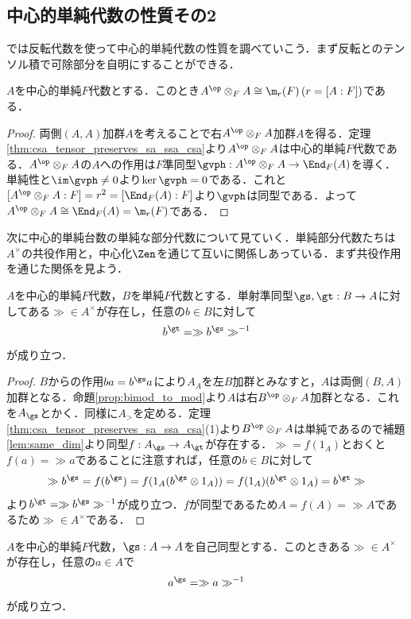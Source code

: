 \documentclass[a4paper,11pt]{jsarticle}
\begin{document}
\subsection{中心的単純代数の性質その2}
では反転代数を使って中心的単純代数の性質を調べていこう．まず反転とのテンソル積で可除部分を自明にすることができる．
\begin{thm}[CSAと反転代数のテンソル積は可除部分が自明]
  $A$を中心的単純$F$代数とする．このとき$A^{\op}\otimes_F A\cong \m_r(F)\,(r=[A:F])$である．
\end{thm}
\begin{proof}
  両側$(A,A)$加群$A$を考えることで右$A^{\op}\otimes_F A$加群$A$を得る．定理\ref{thm:csa_tensor_preserves_sa_ssa_csa}より$A^{\op}\otimes_F A$は中心的単純$F$代数である．$A^{\op}\otimes_F A$の$A$への作用は$F$準同型$\gvph:A^{\op}\otimes_F A\to \End_F(A)$を導く．単純性と$\im\gvph\neq 0$より$\ker\gvph=0$である．これと$[A^{\op}\otimes_F A:F]=r^2=[\End_F(A):F]$より$\gvph$は同型である．よって$A^{\op}\otimes_F A\cong\End_F(A)=\m_r(F)$である．
\end{proof}
次に中心的単純台数の単純な部分代数について見ていく．単純部分代数たちは$A^\times$の共役作用と，中心化$\Zen$を通じて互いに関係しあっている．まず共役作用を通じた関係を見よう．
\begin{thm}[CSAの部分SAは共役]\label{thm:sub_sa_are_conj}
  $A$を中心的単純$F$代数，$B$を単純$F$代数とする．単射準同型$\gs,\gt:B\to A$に対してある$\gg\in A^\times$が存在し，任意の$b\in B$に対して
  \[
    b^\gt = \gg b^\gs \gg^{-1}
  \]
  が成り立つ．
\end{thm}
\begin{proof}
  $B$からの作用$ba=b^{\gs} a$により$A_A$を左$B$加群とみなすと，$A$は両側$(B,A)$加群となる．命題\ref{prop:bimod_to_mod}より$A$は右$B^{\op}\otimes_F A$加群となる．これを$A_{\gs}$とかく．同様に$A_{\gt}$を定める．定理\ref{thm:csa_tensor_preserves_sa_ssa_csa}(1)より$B^{\op}\otimes_F A$は単純であるので補題\ref{lem:same_dim}より同型$f:A_{\gs}\to A_{\gt}$が存在する．$\gg=f(1_A)$とおくと$f(a)=\gg a$であることに注意すれば，任意の$b\in B$に対して
  \[
    \gg b^\gs = f(b^\gs) = f(1_A(b^\gs\otimes 1_A))=f(1_A)(b^\gt\otimes 1_A)=b^\gt\gg
  \]
  より$b^\gt=\gg b^\gs \gg^{-1}$が成り立つ．$f$が同型であるため$A=f(A)=\gg A$であるため$\gg\in A^\times$である．
\end{proof}
\begin{cor}[CSAの自己同型は内部自己同型]
  $A$を中心的単純$F$代数，$\gs:A\to A$を自己同型とする．このときある$\gg\in A^\times$が存在し，任意の$a\in A$で
  \[
    a^\gs = \gg a\gg^{-1}
  \]
  が成り立つ．
\end{cor}
\end{document}
